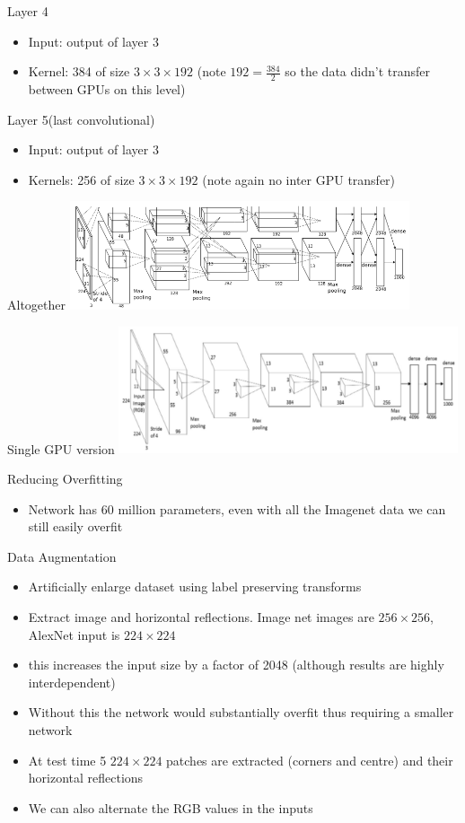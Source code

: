 \documentclass{beamer}
\begin{document}
\begin{frame}
	Layer 4
	\begin{itemize}
		\item Input: output of layer 3
		\item Kernel: 384 of size $3\times 3\times 192$ (note $192=\frac{384}{2}$ so the data didn't transfer between GPUs on this level)
	\end{itemize}
	Layer 5(last convolutional)
	\begin{itemize}
		\item Input: output of layer 3
		\item Kernels: 256 of size $3\times 3\times 192$ (note again no inter GPU transfer)
	\end{itemize}
\end{frame}

\begin{frame}{Altogether}
	\includegraphics[width=10cm]{imagenet2GPU}
\end{frame}
\begin{frame}{Single GPU version}
	\includegraphics[width=10cm]{alexnet}
\end{frame}


\begin{frame}{Reducing Overfitting}
	\begin{itemize}
		\item Network has 60 million parameters, even with all the Imagenet data we can still easily overfit
	\end{itemize}
	Data Augmentation
	\begin{itemize}
		\item Artificially enlarge dataset using label preserving transforms
		\item Extract image and horizontal reflections. Image net images are $256\times 256$, AlexNet input is $224\times 224$
		\item this increases the input size by a factor of 2048 (although results are highly interdependent)
		\item Without this the network would substantially overfit thus requiring a smaller network
		\item At test time 5 $224\times 224$ patches are extracted (corners and centre) and their horizontal reflections
		\item We can also alternate the RGB values in the inputs
	\end{itemize}
\end{frame}
\end{document}
